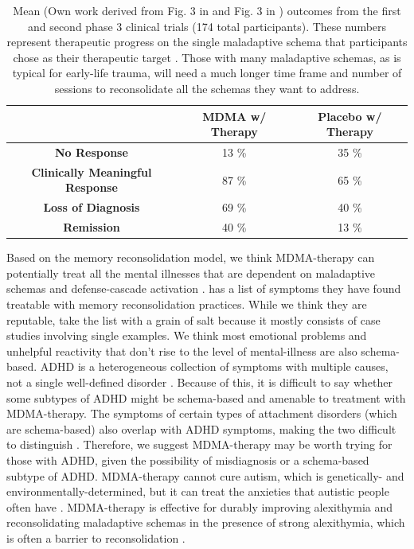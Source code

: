 \documentclass[12pt,letterpaper]{article}
\begin{document}
\FloatBarrier
\begin{table}[h!]
    \centering
    \caption{Mean (Own work derived from Fig. 3 in \textcite{mitchellMDMAClinicalTrial} and Fig. 3 in \textcite{mitchellMDMAClinicalTrial2}) outcomes from the first and second phase 3 clinical trials (174 total participants). These numbers represent therapeutic progress on the single maladaptive schema that participants chose as their therapeutic target \cite{powerTrip}. Those with many maladaptive schemas, as is typical for early-life trauma, will need a much longer time frame and number of sessions to reconsolidate all the schemas they want to address.}
    \label{table:efficacy}
    \begin{tabular}{|c|c|c|}
    \hline
     & \textbf{MDMA w/ Therapy} & \textbf{Placebo w/ Therapy} \\ \hline
    \textbf{No Response}          & 13 \%          & 35 \%          \\ \hline
    \textbf{Clinically Meaningful Response}          & 87 \%          & 65 \%         \\ \hline
    \textbf{Loss of Diagnosis} & 69 \% & 40 \% \\ \hline
    \textbf{Remission}          & 40 \%          & 13 \%          \\ \hline
    \end{tabular}
\end{table}
\FloatBarrier

Based on the memory reconsolidation model, we think MDMA-therapy can potentially treat all the mental illnesses that are dependent on maladaptive schemas and defense-cascade activation \cite{carhart2019rebus,eckerUnlocking}. \textcite{coherenceSymptoms} has a list of symptoms they have found treatable with memory reconsolidation practices. While we think they are reputable, take the list with a grain of salt because it mostly consists of case studies involving single examples. We think most emotional problems and unhelpful reactivity that don't rise to the level of mental-illness are also schema-based. ADHD is a heterogeneous collection of symptoms with multiple causes, not a single well-defined disorder \cite{luoADHDcauses}. Because of this, it is difficult to say whether some subtypes of ADHD might be schema-based and amenable to treatment with MDMA-therapy. The symptoms of certain types of attachment disorders (which are schema-based) also overlap with ADHD symptoms, making the two difficult to distinguish \cite{follan2011discrimination}. Therefore, we suggest MDMA-therapy may be worth trying for those with ADHD, given the possibility of misdiagnosis or a schema-based subtype of ADHD. MDMA-therapy cannot cure autism, which is genetically- and environmentally-determined, but it can treat the anxieties that autistic people often have \cite{taylorAutismEtiology,danforth2018autismMDMA}. MDMA-therapy is effective for durably improving alexithymia and reconsolidating maladaptive schemas in the presence of strong alexithymia, which is often a barrier to reconsolidation \cite{vanSelfExperience}.
\end{document}
